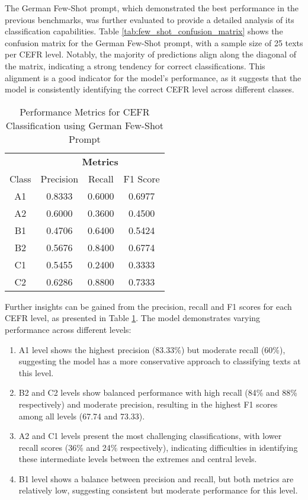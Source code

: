 The German Few-Shot prompt, which demonstrated the best performance in the previous benchmarks, was further evaluated to provide a detailed analysis of its classification capabilities.
Table \ref{tab:few_shot_confusion_matrix} shows the confusion matrix for the German Few-Shot prompt, with a sample size of 25 texts per CEFR level. Notably, the majority of predictions align along the diagonal of the matrix, indicating a strong tendency for correct classifications. This alignment is a good indicator for the model's performance, as it suggests that the model is consistently identifying the correct CEFR level across different classes.

\begin{table}[ht]
    \centering
    \begin{tabular}{c|ccc}
        & \multicolumn{3}{c}{\textbf{Metrics}} \\
        Class & Precision & Recall & F1 Score \\
        \hline
        A1 & 0.8333 & 0.6000 & 0.6977 \\
        A2 & 0.6000 & \cellcolor[rgb]{1,0.9,0.9}0.3600 & \cellcolor[rgb]{1,0.9,0.9}0.4500 \\
        B1 & \cellcolor[rgb]{1,0.9,0.9}0.4706 & 0.6400 & 0.5424 \\
        B2 & 0.5676 & 0.8400 & 0.6774 \\
        C1 & 0.5455 & \cellcolor[rgb]{1,0.9,0.9}0.2400 & \cellcolor[rgb]{1,0.9,0.9}0.3333 \\
        C2 & 0.6286 & 0.8800 & 0.7333 \\
    \end{tabular}
    \caption{Performance Metrics for CEFR Classification using German Few-Shot Prompt}
    \label{tab:cefr_performance_metrics}
\end{table}

Further insights can be gained from the precision, recall and F1 scores for each CEFR level, as presented in Table \ref{tab:cefr_performance_metrics}. The model demonstrates varying performance across different levels:
\begin{enumerate}
    \item A1 level shows the highest precision (83.33\%) but moderate recall (60\%), suggesting the model has a more conservative approach to classifying texts at this level.
    \item B2 and C2 levels show balanced performance with high recall (84\% and 88\% respectively) and moderate precision, resulting in the highest F1 scores among all levels (67.74 and 73.33).
    \item A2 and C1 levels present the most challenging classifications, with lower recall scores (36\% and 24\% respectively), indicating difficulties in identifying these intermediate levels between the extremes and central levels.
    \item B1 level shows a balance between precision and recall, but both metrics are relatively low, suggesting consistent but moderate performance for this level.
\end{enumerate}

